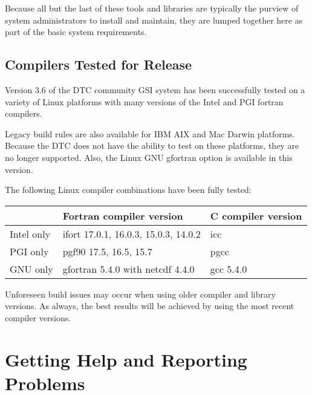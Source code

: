 Because all but the last of these tools and libraries are typically the purview of system administrators to install and maintain, they are lumped together here as part of the basic system requirements.

\subsection{Compilers Tested for Release}

Version 3.6 of the DTC community GSI system has been successfully tested on a variety of Linux platforms with many versions of the Intel and PGI fortran compilers.

Legacy build rules are also available for IBM AIX and Mac Darwin platforms. Because the DTC does not have the ability to test on these platforms, they are no longer supported. Also, the Linux GNU gfortran option is available in this version.

The following Linux compiler combinations have been fully tested:
\begin{table}[htbp]
\centering
\begin{tabular}{| l | l | l |}
\hline
  & Fortran compiler version   &   C compiler version    \\
\hline
\hline
Intel only  &  ifort    17.0.1, 16.0.3, 15.0.3, 14.0.2       & icc \\
\hline
PGI only  &   pgf90   17.5, 16.5, 15.7    &  pgcc  \\
\hline
GNU only &  gfortran  5.4.0  with netcdf 4.4.0  & gcc 5.4.0 \\
\hline
\end{tabular}
\label{ch2_tble3}
\end{table} 

Unforeseen build issues may occur when using older compiler and library versions. As always, the best results will be achieved by using the most recent compiler versions.

\section{Getting Help and Reporting Problems}  \label{ch2_gettinghelp}

